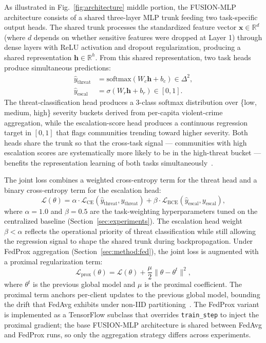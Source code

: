 \documentclass[conference]{IEEEtran}
\begin{document}
As illustrated in Fig.~\ref{fig:architecture} middle portion, the FUSION-MLP architecture consists of a shared three-layer MLP trunk feeding two task-specific output heads. The shared trunk processes the standardized feature vector $\mathbf{x} \in \mathbb{R}^{d}$ (where $d$ depends on whether sensitive features were dropped at Layer 1) through dense layers with ReLU activation and dropout regularization, producing a shared representation $\mathbf{h} \in \mathbb{R}^{h}$. From this shared representation, two task heads produce simultaneous predictions:
\begin{align}
\hat{y}_{\text{threat}} &= \text{softmax}(W_{c}\mathbf{h} + b_{c}) \in \Delta^{2}, \\
\hat{y}_{\text{escal}} &= \sigma(W_{r}\mathbf{h} + b_{r}) \in [0, 1].
\end{align}
The threat-classification head produces a 3-class softmax distribution over \{low, medium, high\} severity buckets derived from per-capita violent-crime aggregation, while the escalation-score head produces a continuous regression target in $[0, 1]$ that flags communities trending toward higher severity. Both heads share the trunk so that the cross-task signal --- communities with high escalation scores are systematically more likely to be in the high-threat bucket --- benefits the representation learning of both tasks simultaneously~\cite{caruana1997multitask}.

The joint loss combines a weighted cross-entropy term for the threat head and a binary cross-entropy term for the escalation head:
\begin{equation}
\mathcal{L}(\theta) = \alpha \cdot \mathcal{L}_{\text{CE}}(\hat{y}_{\text{threat}}, y_{\text{threat}}) + \beta \cdot \mathcal{L}_{\text{BCE}}(\hat{y}_{\text{escal}}, y_{\text{escal}}),
\label{eq:joint_loss}
\end{equation}
where $\alpha = 1.0$ and $\beta = 0.5$ are the task-weighting hyperparameters tuned on the centralized baseline (Section~\ref{sec:experiments}). The escalation head weight $\beta < \alpha$ reflects the operational priority of threat classification while still allowing the regression signal to shape the shared trunk during backpropagation. Under FedProx aggregation (Section~\ref{sec:method:fed}), the joint loss is augmented with a proximal regularization term:
\begin{equation}
\mathcal{L}_{\text{prox}}(\theta) = \mathcal{L}(\theta) + \frac{\mu}{2}\|\theta - \theta^{t}\|^{2},
\label{eq:prox_loss}
\end{equation}
where $\theta^{t}$ is the previous global model and $\mu$ is the proximal coefficient. The proximal term anchors per-client updates to the previous global model, bounding the drift that FedAvg exhibits under non-IID partitioning~\cite{li2020fedprox}. The FedProx variant is implemented as a TensorFlow subclass that overrides \texttt{train\_step} to inject the proximal gradient; the base FUSION-MLP architecture is shared between FedAvg and FedProx runs, so only the aggregation strategy differs across experiments.
\end{document}
